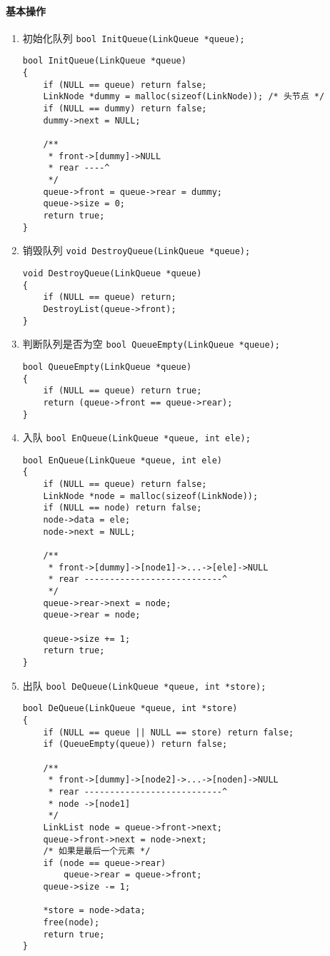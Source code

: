 \documentclass{ctexart}
\begin{document}
\paragraph{基本操作}
\begin{enumerate}
\item 初始化队列 \texttt{bool InitQueue(LinkQueue *queue);}
\begin{verbatim}
bool InitQueue(LinkQueue *queue)
{
    if (NULL == queue) return false;
    LinkNode *dummy = malloc(sizeof(LinkNode)); /* 头节点 */
    if (NULL == dummy) return false;
    dummy->next = NULL;

    /**
     * front->[dummy]->NULL
     * rear ----^
     */
    queue->front = queue->rear = dummy;
    queue->size = 0;
    return true;
}
\end{verbatim}

\item 销毁队列 \texttt{void DestroyQueue(LinkQueue *queue);}
\begin{verbatim}
void DestroyQueue(LinkQueue *queue)
{
    if (NULL == queue) return;
    DestroyList(queue->front);
}
\end{verbatim}

\item 判断队列是否为空 \texttt{bool QueueEmpty(LinkQueue *queue);}
\begin{verbatim}
bool QueueEmpty(LinkQueue *queue)
{
    if (NULL == queue) return true;
    return (queue->front == queue->rear);
}
\end{verbatim}

\item 入队 \texttt{bool EnQueue(LinkQueue *queue, int ele);}
\begin{verbatim}
bool EnQueue(LinkQueue *queue, int ele)
{
    if (NULL == queue) return false;
    LinkNode *node = malloc(sizeof(LinkNode));
    if (NULL == node) return false;
    node->data = ele;
    node->next = NULL;

    /**
     * front->[dummy]->[node1]->...->[ele]->NULL
     * rear ---------------------------^
     */
    queue->rear->next = node;
    queue->rear = node;

    queue->size += 1;
    return true;
}
\end{verbatim}

\item 出队 \texttt{bool DeQueue(LinkQueue *queue, int *store);}
\begin{verbatim}
bool DeQueue(LinkQueue *queue, int *store)
{
    if (NULL == queue || NULL == store) return false;
    if (QueueEmpty(queue)) return false;

    /**
     * front->[dummy]->[node2]->...->[noden]->NULL
     * rear ---------------------------^
     * node ->[node1]
     */
    LinkList node = queue->front->next;
    queue->front->next = node->next;
    /* 如果是最后一个元素 */
    if (node == queue->rear)
        queue->rear = queue->front;
    queue->size -= 1;

    *store = node->data;
    free(node);
    return true;
}
\end{verbatim}
\end{enumerate}
\end{document}

